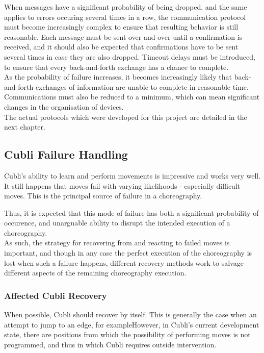 When messages have a significant probability of being dropped, and the same applies to errors occuring several times in a row, the communication protocol must become increasingly complex to ensure that resulting behavior is still reasonable. Each message must be sent over and over until a confirmation is received, and it should also be expected that confirmations have to be sent several times in case they are also dropped. Timeout delays must be introduced, to ensure that every back-and-forth exchange has a chance to complete.\\

As the probability of failure increases, it becomes increasingly likely that back-and-forth exchanges of information are unable to complete in reasonable time. Communications must also be reduced to a minimum, which can mean significant changes in the organisation of devices.\\

The actual protocols which were developed for this project are detailed in the next chapter.

\subsection{Cubli Failure Handling}

Cubli's ability to learn and perform movements is impressive and works very well. It still happens that moves fail with varying likelihoods - especially difficult moves. This is the principal source of failure in a choreography.

Thus, it is expected that this mode of failure has both a significant probability of occurence, and unarguable ability to disrupt the intended execution of a choreography.\\

As such, the strategy for recovering from and reacting to failed moves is important, and though in any case the perfect execution of the choreography is lost when such a failure happens, different recovery methods work to salvage different aspects of the remaining choreography execution.

\subsubsection{Affected Cubli Recovery}

When possible, Cubli should recover by itself. This is generally the case when an attempt to jump to an edge, for exampleHowever, in Cubli's current development state, there are positions from which the possibility of performing moves is not programmed, and thus in which Cubli requires outside intervention.\\

